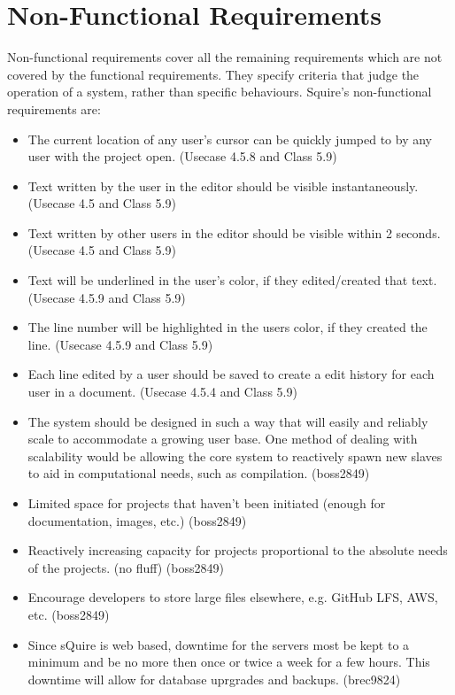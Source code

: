 \documentclass[11pt]{report}
\begin{document}
    
\section{Non-Functional Requirements}
    Non-functional requirements cover all the remaining requirements which are not covered by the functional requirements. They specify criteria that judge the operation of a system, rather than specific behaviours. Squire's non-functional requirements are:
    \begin{itemize}
        \item The current location of any user's cursor can be quickly jumped to by any user with the project open. (Usecase 4.5.8 and Class 5.9)
        \item Text written by the user in the editor should be visible instantaneously. (Usecase 4.5 and Class 5.9)
        \item Text written by other users in the editor should be visible within 2 seconds. (Usecase 4.5 and Class 5.9)
        \item Text will be underlined in the user's color, if they edited/created that text. (Usecase 4.5.9 and Class 5.9)
        \item The line number will be highlighted in the users color, if they created the line. (Usecase 4.5.9 and Class 5.9)
        \item Each line edited by a user should be saved to create a edit history for each user in a document. (Usecase 4.5.4 and Class 5.9)
        \item The system should be designed in such a way that will easily and reliably scale to accommodate a growing user base. One method of dealing with scalability would be allowing the core system to reactively spawn new slaves to aid in computational needs, such as compilation. (boss2849)
        \item Limited space for projects that haven't been initiated (enough for documentation, images, etc.) (boss2849)
        \item Reactively increasing capacity for projects proportional to the absolute needs of the projects. (no fluff) (boss2849)
        \item Encourage developers to store large files elsewhere, e.g. GitHub LFS, AWS, etc. (boss2849)
        \item Since sQuire is web based, downtime for the servers most be kept to a minimum and be no more then once or twice a week for a few hours. This downtime will allow for database uprgrades and backups. (brec9824)

\end{itemize}
\end{document}
